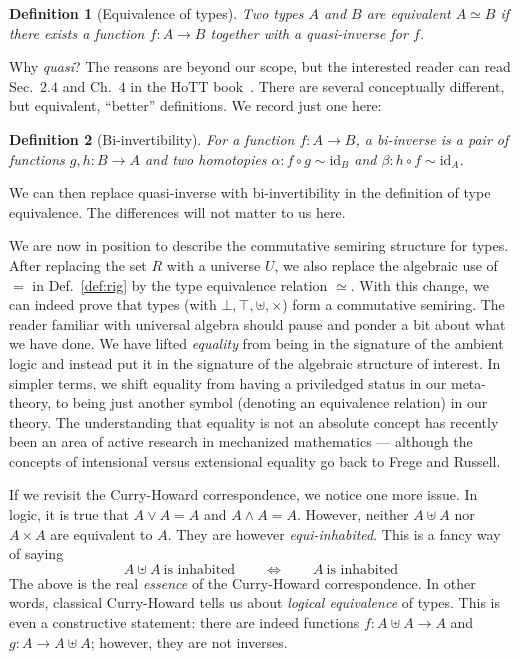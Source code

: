\documentclass{article}
\newtheorem{defn}{Definition}[section]
\begin{document}
\begin{defn}[Equivalence of types]
  Two types $A$ and $B$ are equivalent $A \simeq B$ if there exists a
  function $f : A \rightarrow B$ together with a quasi-inverse for $f$.
\end{defn}

\noindent Why \emph{quasi}? The reasons are beyond our scope, but the
interested reader can read Sec.~$2.4$ and Ch.~$4$ in the HoTT
book~\cite{hottbook}.  There are several conceptually different, but
equivalent, ``better'' definitions.  We record just one here:

\begin{defn}[Bi-invertibility]
\label{def:biinv}
For a function $f : A \rightarrow B$, a \emph{bi-inverse} is a
pair of functions $g,h : B \rightarrow A$ and two homotopies
$\alpha : f \circ g \sim \mathrm{id}_B$ and
$\beta : h \circ f \sim \mathrm{id}_A$.
\end{defn}

\noindent We can then replace quasi-inverse with bi-invertibility in
the definition of type equivalence. The differences will not matter to
us here.

We are now in position to describe the commutative
semiring structure for types. After replacing the set $R$ with a
universe $U$, we also replace the algebraic use of $=$ in
Def.~\ref{def:rig} by the type equivalence relation $\simeq$. With
this change, we can indeed prove that types (with $\bot, \top, \uplus,
\times$) form a commutative semiring. The reader familiar with
universal algebra should pause and ponder a bit about what we have
done. We have lifted \emph{equality} from being in the signature of
the ambient logic and instead put it in the signature of the algebraic
structure of interest.  In simpler terms, we shift equality from
having a priviledged status in our meta-theory, to being just another
symbol (denoting an equivalence relation) in our theory.  The understanding
that equality is not an absolute concept has recently been an area of
active research in mechanized mathematics --- although the concepts of
intensional versus extensional equality go back to Frege and Russell.

If we revisit the Curry-Howard correspondence, we notice one
more issue. In logic, it is true that $A \lor A = A$ and
$A \land A = A$. However, neither $A \uplus A$ nor $A \times A$ are
equivalent to $A$. They are however \emph{equi-inhabited}. This is
a fancy way of saying
\[ A \uplus A \ \text{is inhabited} \qquad \Leftrightarrow \qquad A \
  \text{is inhabited} \] The above is the real \textit{essence} of the
Curry-Howard correspondence.  In other words, classical Curry-Howard
tells us about \emph{logical equivalence} of types. This is even a
constructive statement: there are indeed functions
$f : A \uplus A \rightarrow A$ and $g : A \rightarrow A \uplus A$;
however, they are not inverses.
\end{document}
